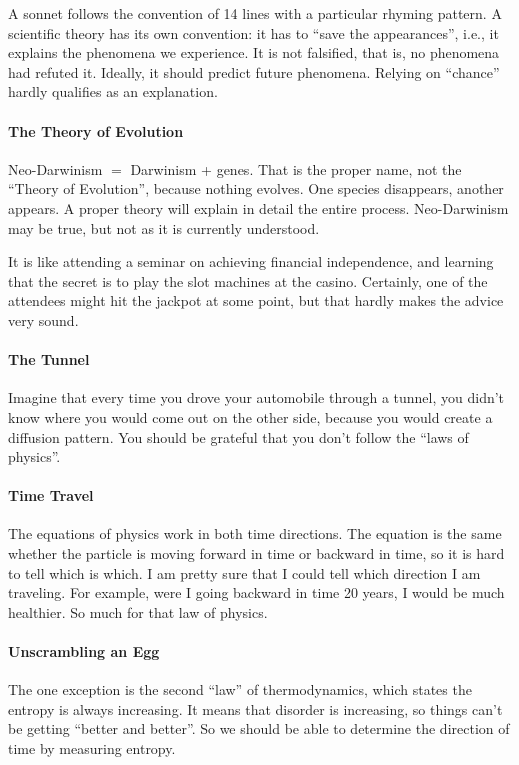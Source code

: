 A sonnet follows the convention of 14 lines with a particular rhyming pattern. A scientific theory has its own
convention: it has to “save the appearances”, i.e., it explains the phenomena we experience. It is not falsified, that
is, no phenomena had refuted it. Ideally, it should predict future phenomena. Relying on “chance” hardly qualifies as
an explanation.

\paragraph{The Theory of Evolution}
Neo-Darwinism $=$ Darwinism + genes. That is the proper name, not the “Theory of Evolution”, because nothing evolves. One
species disappears, another appears. A proper theory will explain in detail the entire process. Neo-Darwinism may be
true, but not as it is currently understood.

It is like attending a seminar on achieving financial independence, and learning that the secret is to play the slot
machines at the casino. Certainly, one of the attendees might hit the jackpot at some point, but that hardly makes the
advice very sound.

\paragraph{The Tunnel}
Imagine that every time you drove your automobile through a tunnel, you didn't know where you would come out
on the other side, because you would create a diffusion pattern. You should be grateful that you don't
follow the “laws of physics”.

\paragraph{Time Travel}
The equations of physics work in both time directions. The equation is the same whether the particle is moving forward
in time or backward in time, so it is hard to tell which is which. I am pretty sure that I could tell which direction I
am traveling. For example, were I going backward in time 20 years, I would be much healthier. So much for that law of
physics.

\paragraph{Unscrambling an Egg}
The one exception is the second “law” of thermodynamics, which states the entropy is always increasing. It means that
disorder is increasing, so things can't be getting “better and better”. So we should be able to determine
the direction of time by measuring entropy.

